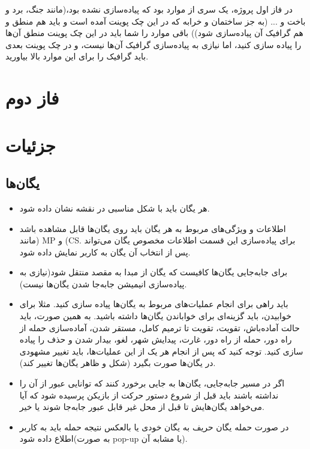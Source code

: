 \documentclass[]{article}
\begin{document}
در فاز اول پروژه، یک سری از موارد بود که پیاده‌سازی نشده بود،(مانند جنگ، برد و باخت و ... (به جز ساختمان و خرابه که در این چک پوینت آمده است و باید هم منطق و هم گرافیک آن پیاده‌سازی شود)) باقی موارد را شما باید در این چک پوینت منطق آن‌ها را پیاده سازی کنید، اما نیازی به پیاده‌سازی گرافیک آن‌ها نیست، و در چک پوینت بعدی باید گرافیک را برای این موارد بالا بیاورید.


\section*{{\titr فاز دوم}}


\section*{{\titr جزئیات}}


\subsection*{{\titr یگان‌ها}}

\begin{itemize}
\item هر یگان باید با شکل مناسبی در نقشه نشان داده شود.

\item اطلاعات و ویژگی‌های مربوط به هر یگان باید روی یگان‌ها قابل مشاهده باشد (مانند MP و (CS. برای پیاده‌سازی این قسمت اطلاعات مخصوص یگان می‌تواند پس از انتخاب آن یگان به کاربر نمایش داده شود.

\item برای جابه‌جایی یگان‌ها کافیست که یگان از مبدا به مقصد منتقل شود(نیازی به پیاده‌سازی انیمیشن جابه‌جا شدن یگان‌ها نیست).

\item باید راهی برای انجام عملیات‌های مربوط به یگان‌ها پیاده سازی کنید. مثلا برای خوابیدن، باید گزینه‌ای برای خواباندن یگان‌ها داشته باشید. به همین صورت، باید حالت آماده‌باش، تقویت، تقویت تا ترمیم کامل، مستقر شدن، آماده‌سازی حمله از راه دور، حمله از راه دور، غارت، پیدایش شهر، لغو، بیدار شدن و حذف را پیاده سازی کنید. توجه کنید که پس از انجام هر یک از این عملیات‌ها، باید تغییر مشهودی در یگان‌ها صورت بگیرد (شکل و ظاهر یگان‌ها تغییر کند).

\item اگر در مسیر جابه‌جایی، یگان‌ها به جایی برخورد کنند که توانایی عبور از آن را نداشته باشند باید قبل از شروع دستور حرکت از بازیکن پرسیده شود که آیا می‌خواهد یگان‌هایش تا قبل از محل غیر قابل عبور جابه‌جا شوند یا خیر.

\item در صورت حمله یگان حریف به یگان خودی یا بالعکس نتیجه حمله باید به کاربر اطلاع داده شود(به صورت pop-up یا مشابه آن).  

\end{itemize}
\end{document}
